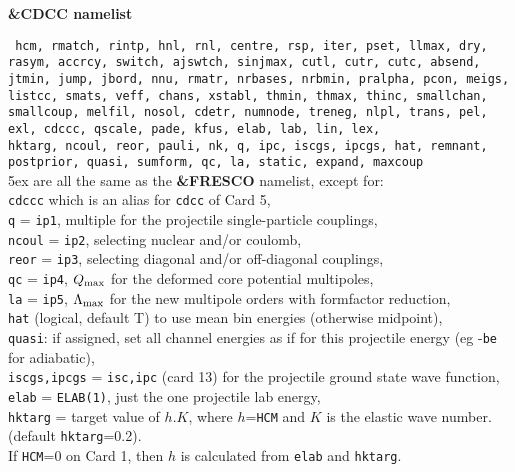 \documentclass[11pt]{article}
\begin{document}
{\bf \&CDCC namelist}

{\tt
hcm, rmatch, rintp, hnl, rnl, centre,  rsp, iter, pset, llmax,  dry,
rasym, accrcy, switch, ajswtch, sinjmax,  cutl, cutr, cutc,
absend, jtmin, jump, jbord, nnu,  rmatr, nrbases, nrbmin,  pralpha, pcon,  meigs,
listcc, smats, veff, chans, xstabl, thmin, thmax, thinc,
smallchan, smallcoup, melfil, nosol, cdetr, numnode, treneg,
nlpl, trans, pel, exl, cdccc, qscale, pade, kfus,
elab,  lab, lin, lex, \\

 hktarg, ncoul, reor, pauli,  nk,
q, ipc, iscgs, ipcgs,  hat, remnant, postprior, quasi,
sumform, qc, la, static, expand, maxcoup
}\\

\vspace{-3mm}
\hangindent 5ex
are all the same as the {\bf \&FRESCO} namelist, except for:\\
{\tt cdccc} which is an alias for {\tt cdcc} of Card 5,\\
{\tt q} = {\tt ip1}, multiple for the projectile single-particle couplings,\\
{\tt ncoul} = {\tt ip2}, selecting nuclear and/or coulomb,\\
{\tt reor} = {\tt ip3}, selecting diagonal and/or off-diagonal couplings,\\
{\tt qc} = {\tt ip4}, $Q_{\rm max}$ for the deformed core potential multipoles,\\
{\tt la} = {\tt ip5}, $\Lambda_{\rm max}$ for the new multipole orders with formfactor reduction,\\
{\tt hat} (logical, default T) to use mean bin energies (otherwise midpoint),\\
{\tt quasi}: if assigned, set all channel energies as if for this projectile
energy (eg -{\tt be} for adiabatic),\\
{\tt iscgs,ipcgs} = {\tt isc,ipc} (card 13) for the projectile ground state wave
function,\\
{\tt elab} = {\tt ELAB(1)}, just the one projectile lab energy,\\
{\tt hktarg} = target value of $h.K$, where $h$={\tt HCM} and $K$ is the elastic wave number.
(default {\tt hktarg}=0.2). \\
\hspace*{1cm} If {\tt HCM}=0 on Card 1,
then $h$ is calculated from {\tt elab} and {\tt hktarg}.\\
\end{document}
